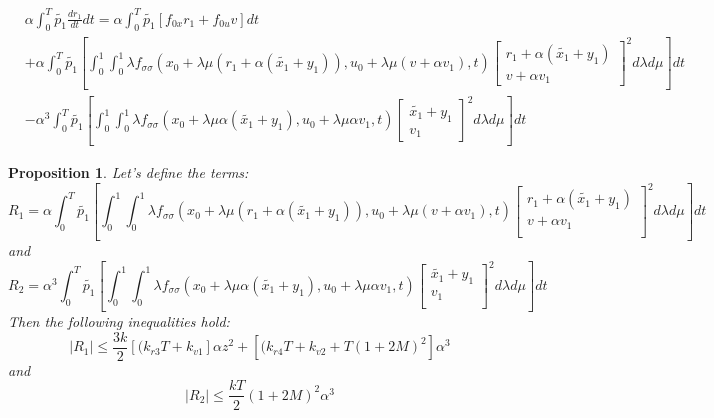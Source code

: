 \documentclass[a4paper,10pt]{article}
\newtheorem{proposition}{Proposition}
\begin{document}
\begin{equation}
    \label{Expansion2}
	\begin{split}
    & \alpha \int_{0}^{T}  \tilde{p_{1}} \frac{dr_{1}}{dt}dt  
    =\alpha \int_{0}^{T} \tilde{p_{1}}[f_{0x}r_{1} + f_{0u}v] dt 
    \\ 
	&
     + \alpha  \int_{0}^{T}  \tilde{p_{1}}
     \left[\int_{0}^{1} \int_{0}^{1} 
	\lambda f_{\sigma \sigma}(x_{0} + \lambda \mu (r_{1} + \alpha(\tilde{x_{1}}+y_{1})),
	u_{0} + \lambda \mu (v + \alpha v_{1}),t)
	\left[\begin{array}
	{c}
	    r_{1} + \alpha(\tilde{x_{1}}+y_{1})  \\
	     v + \alpha v_{1}
	\end{array}\right]^{2} d \lambda d \mu\right]dt 
    \\ &
     - \alpha^{3} \int_{0}^{T} \tilde{p_{1}}
     \left[ \int_{0}^{1} \int_{0}^{1} 
	\lambda f_{\sigma \sigma}(x_{0} + \lambda \mu\alpha(\tilde{x_{1}}+y_{1}),
	u_{0} + \lambda \mu \alpha v_{1},t)
	\left[\begin{array}
	{c}
	    \tilde{x_{1}}+y_{1}  \\
	    v_{1} 
	\end{array}\right]^{2} d \lambda d \mu \right]dt 
	\end{split}
\end{equation}
\begin{proposition}
    Let's define the terms:
    \[
        R_{1} = \alpha \int_{0}^{T}  \tilde{p_{1}}
     \left[\int_{0}^{1} \int_{0}^{1}
	\lambda f_{\sigma \sigma}(x_{0} + \lambda \mu (r_{1} + \alpha(\tilde{x_{1}}+y_{1})),
	u_{0} + \lambda \mu (v + \alpha v_{1}),t)
	\left[\begin{array}
	{c}
	    r_{1} + \alpha(\tilde{x_{1}}+y_{1})  \\
	     v + \alpha v_{1}\\
	\end{array}\right]^{2} d \lambda d \mu\right]dt 
    \]
    and 
    \[
        R_{2} = \alpha^{3} \int_{0}^{T} \tilde{p_{1}}
     \left[ \int_{0}^{1} \int_{0}^{1}
	\lambda f_{\sigma \sigma}(x_{0} + \lambda \mu\alpha(\tilde{x_{1}}+y_{1}),
	u_{0} + \lambda \mu \alpha v_{1},t)
	\left[\begin{array}
	{c}
	    \tilde{x_{1}}+y_{1}  \\
	     v_{1} \\
	\end{array}\right]^{2} d \lambda d \mu \right]dt 
    \]
    Then the following inequalities hold:
    \begin{equation}
        |R_{1}| \leq \frac{3k}{2}[(k_{r3}T + k_{v1}] \alpha z^{2}  
	+[(k_{r4}T + k_{v2} + T(1+2M)^{2}] \alpha^{3}
        \label{R1bound}
    \end{equation}
    and
    \begin{equation}
        |R_{2}| \leq \frac{kT}{2}(1+2M)^{2} \alpha^{3}
        \label{R2bound}
    \end{equation}
\end{proposition}
\end{document}
